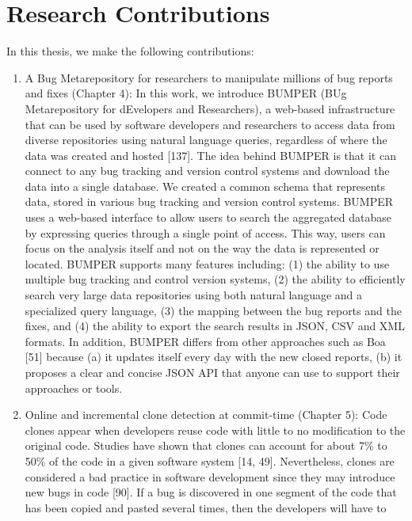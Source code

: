 \documentclass[12pt]{report}
\begin{document}
\section{Research Contributions}\label{research-contributions}

In this thesis, we make the following contributions:

\begin{enumerate}
\def\labelenumi{\arabic{enumi}.}
\item
  A Bug Metarepository for researchers to manipulate millions of bug
  reports and fixes (Chapter 4): In this work, we introduce BUMPER (BUg
  Metarepository for dEvelopers and Researchers), a web-based
  infrastructure that can be used by software developers and researchers
  to access data from diverse repositories using natural language
  queries, regardless of where the data was created and hosted
  {[}137{]}. The idea behind BUMPER is that it can connect to any bug
  tracking and version control systems and download the data into a
  single database. We created a common schema that represents data,
  stored in various bug tracking and version control systems. BUMPER
  uses a web-based interface to allow users to search the aggregated
  database by expressing queries through a single point of access. This
  way, users can focus on the analysis itself and not on the way the
  data is represented or located. BUMPER supports many features
  including: (1) the ability to use multiple bug tracking and control
  version systems, (2) the ability to efficiently search very large data
  repositories using both natural language and a specialized query
  language, (3) the mapping between the bug reports and the fixes, and
  (4) the ability to export the search results in JSON, CSV and XML
  formats. In addition, BUMPER differs from other approaches such as Boa
  {[}51{]} because (a) it updates itself every day with the new closed
  reports, (b) it proposes a clear and concise JSON API that anyone can
  use to support their approaches or tools.
\item
  Online and incremental clone detection at commit-time (Chapter 5):
  Code clones appear when developers reuse code with little to no
  modification to the original code. Studies have shown that clones can
  account for about 7\% to 50\% of the code in a given software system
  {[}14, 49{]}. Nevertheless, clones are considered a bad practice in
  software development since they may introduce new bugs in code
  {[}90{]}. If a bug is discovered in one segment of the code that has
  been copied and pasted several times, then the developers will have to

\end{enumerate}
\end{document}
